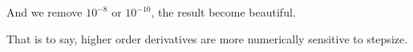 \documentclass[11pt]{article}
\begin{document}
\begin{figure}[H]
	\centering
\end{figure}
And we remove $10^{-8}$ or $10^{-10}$, the result become beautiful.
\begin{figure}[H]
	\centering
\end{figure}
That is to say, higher order derivatives are more numerically sensitive to stepsize.
\end{document}
